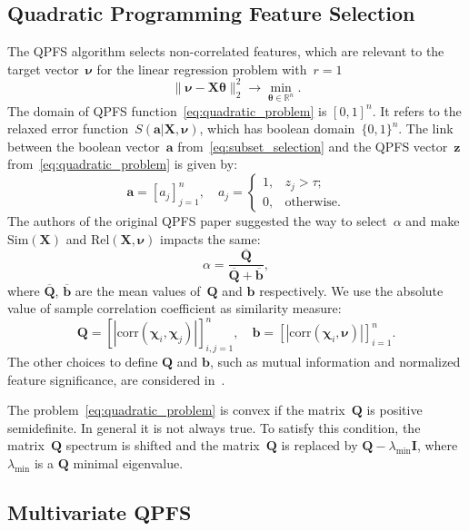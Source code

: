 \documentclass[12pt,twoside]{article}
\theoremstyle{definition}
\newcommand{\ba}{\mathbf{a}}
\newcommand{\bz}{\mathbf{z}}
\newcommand{\bb}{\mathbf{b}}
\newcommand{\bX}{\mathbf{X}}
\newcommand{\bQ}{\mathbf{Q}}
\newcommand{\bbR}{\mathbb{R}}
\newcommand{\bchi}{\boldsymbol{\chi}}
\newcommand{\bnu}{\boldsymbol{\nu}}
\newcommand{\btheta}{\boldsymbol{\theta}}
\begin{document}
\subsection{Quadratic Programming Feature Selection}
The QPFS algorithm selects non-correlated features, which are relevant to the target vector~$\bnu$ for the linear regression problem with~$r=1$
\begin{equation*}
	\| \bnu - \bX \btheta\|_2^2 \rightarrow\min_{\btheta \in \bbR^{n}}.
\end{equation*}
The domain of QPFS function~\eqref{eq:quadratic_problem} is $[0, 1]^n$. It refers to the relaxed error function~$S(\ba | \bX, \bnu)$, which has boolean domain~$\{0, 1\}^n$. 
The link between the boolean vector~$\ba$ from~\eqref{eq:subset_selection} and the QPFS vector~$\bz$ from~\eqref{eq:quadratic_problem} is given by:
\[
\ba = [a_j]_{j=1}^n, \quad 
a_j = \begin{cases}
1, & z_j > \tau; \\
0, & \text{otherwise}.
\end{cases}
\]
The authors of the original QPFS paper suggested the way to select~$\alpha$ and make $\text{Sim}(\bX)$ and $\text{Rel}(\bX, \bnu)$ impacts the same:
\begin{equation*}
	\alpha = \frac{\overline{\bQ}}{\overline{\bQ} + \overline{\bb}},
\end{equation*}
where $\overline{\bQ}$, $\overline{\bb}$ are the mean values of~$\bQ$ and $\bb$ respectively.
We use the absolute value of sample correlation coefficient as similarity measure:
\begin{equation}
	\bQ = \left[\left|\text{corr}(\bchi_i, \bchi_j)\right|\right]_{i,j=1}^n, \quad \bb = \left[\left|\text{corr}(\bchi_i, \bnu)\right|\right]_{i=1}^n.
	\label{eq:qpfs_1d_qb}
\end{equation}
The other choices to define $\bQ$ and $\bb$, such as mutual information and normalized feature significance, are considered in~\cite{katrutsa2017comprehensive}.

The problem~\eqref{eq:quadratic_problem} is convex if the matrix~$\bQ$ is positive semidefinite. In general it is not always true.
To satisfy this condition, the matrix~$\bQ$ spectrum is shifted and the matrix~$\bQ$ is replaced by $\bQ - \lambda_{\text{min}} \mathbf{I}$, where $\lambda_{\text{min}} $ is a $\bQ$ minimal eigenvalue.


\subsection{Multivariate QPFS}
\end{document}
